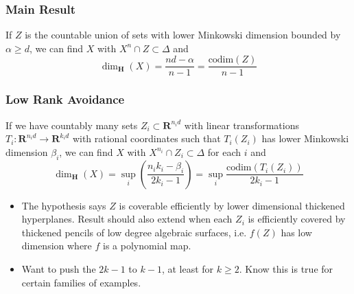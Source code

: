 \documentclass[usenames,dvipsnames]{beamer}
\begin{document}
\begin{frame}
    \frametitle{Main Result}

    \begin{theorem}
        If $Z$ is the countable union of sets with lower Minkowski dimension bounded by $\alpha \geq d$, we can find $X$ with $X^n \cap Z \subset \Delta$ and
        \[ \dim_{\mathbf{H}}(X) = \frac{nd - \alpha}{n - 1} = \frac{\text{codim}(Z)}{n - 1} \]
    \end{theorem}

\end{frame}

\begin{frame}
    \frametitle{Low Rank Avoidance}

    \begin{theorem}
        If we have countably many sets $Z_i \subset \mathbf{R}^{n_id}$ with linear transformations $T_i: \mathbf{R}^{n_id} \to \mathbf{R}^{k_i d}$ with rational coordinates such that $T_i(Z_i)$ has lower Minkowski dimension $\beta_i$, we can find $X$ with $X^{n_i} \cap Z_i \subset \Delta$ for each $i$ and
        \[ \dim_{\mathbf{H}}(X) = \sup_i \left( \frac{n_ik_i - \beta_i}{2k_i - 1} \right) = \sup_i \frac{\text{codim}(T_i(Z_i))}{2k_i - 1} \]
    \end{theorem}

    \pause
    \begin{itemize}
        \item The hypothesis says $Z$ is coverable efficiently by lower dimensional thickened hyperplanes. Result should also extend when each $Z_i$ is efficiently covered by thickened pencils of low degree algebraic surfaces, i.e. $f(Z)$ has low dimension where $f$ is a polynomial map.

        \pause
        \item Want to push the $2k - 1$ to $k - 1$, at least for $k \geq 2$. Know this is true for certain families of examples.
    \end{itemize}
\end{frame}
\end{document}
